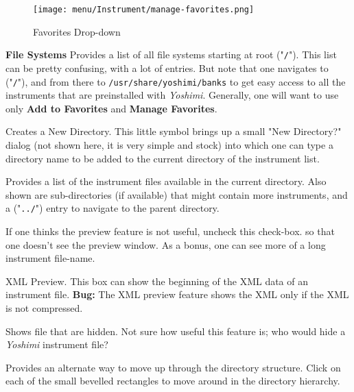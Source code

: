 \begin{figure}[H]
   \centering 
   \texttt{[image: menu/Instrument/manage-favorites.png]}
   \caption{Favorites Drop-down}
   \label{fig:manage_instrument_favorites}
\end{figure}

   \textbf{File Systems} 
   Provides a list of all file systems starting at root ("\texttt{/}").
   This list can be pretty confusing, with a lot of entries.
   But note that one navigates to ("\texttt{/}"), and from there to
   \texttt{/usr/share/yoshimi/banks} to get easy access to all the
   instruments that are preinstalled with
   \textsl{Yoshimi}.
   Generally, one will want to use only
   \textbf{Add to Favorites} and \textbf{Manage Favorites}.

   Creates a New Directory.
   This little symbol brings up a small "New Directory?" dialog (not shown
   here, it is very simple and stock) into which one can type a directory
   name to be added to the current directory of the instrument list.

   Provides a list of the instrument files available in the current
   directory.  Also shown are sub-directories (if available)
   that might contain more instruments, and a ("\texttt{../}") entry
   to navigate to the parent directory.

   If one thinks the preview feature is not useful, uncheck this check-box.
   so that one doesn't see the preview window.  As a bonus, one can see more
   of a long instrument file-name.

   XML Preview.
   This box can show the beginning of the XML data of an instrument file.
   \textbf{Bug:}
   The XML preview feature shows the XML only if the XML is not compressed.

   Shows file that are hidden.  Not sure how useful this feature is;
   who would hide a \textsl{Yoshimi} instrument file?

   Provides an alternate way to move up through the directory structure.
   Click on each of the small bevelled rectangles to move around in the
   directory hierarchy.

